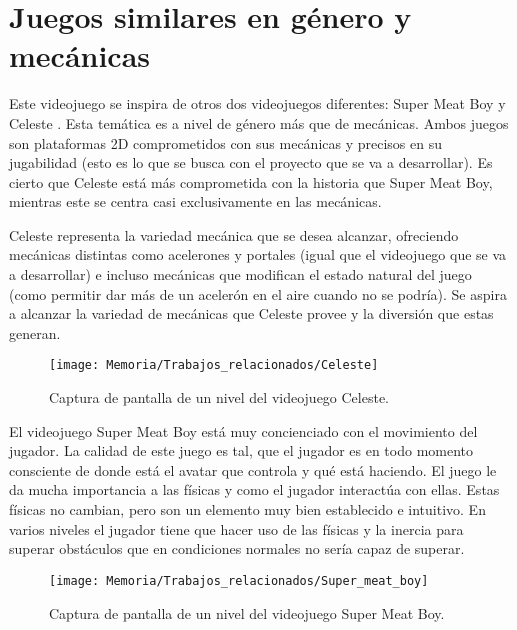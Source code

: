 
\section{Juegos similares en género y mecánicas}
Este videojuego se inspira de otros dos videojuegos diferentes: Super Meat Boy \footnotemark y Celeste \footnotemark . Esta temática es a nivel de género más que de mecánicas. Ambos juegos son plataformas 2D comprometidos con sus mecánicas y precisos en su jugabilidad (esto es lo que se busca con el proyecto que se va a desarrollar). Es cierto que Celeste está más comprometida con la historia que Super Meat Boy, mientras este se centra casi exclusivamente en las mecánicas.

Celeste representa la variedad mecánica que se desea alcanzar, ofreciendo mecánicas distintas como acelerones y portales (igual que el videojuego que se va a desarrollar) e incluso mecánicas que modifican el estado natural del juego (como permitir dar más de un acelerón en el aire cuando no se podría). Se aspira a alcanzar la variedad de mecánicas que Celeste provee y la diversión que estas generan.



\clearpage
\begin{figure}[h]
\centering
\texttt{[image: Memoria/Trabajos\_relacionados/Celeste]}
\caption{Captura de pantalla de un nivel del videojuego Celeste.}
\end{figure}

El videojuego Super Meat Boy está muy concienciado con el movimiento del jugador. La calidad de este juego es tal, que el jugador es en todo momento consciente de donde está el avatar que controla y qué está haciendo. El juego le da mucha importancia a las físicas y como el jugador interactúa con ellas. Estas físicas no cambian, pero son un elemento muy bien establecido e intuitivo. En varios niveles el jugador tiene que hacer uso de las físicas y la inercia para superar obstáculos que en condiciones normales no sería capaz de superar.

\begin{figure}[h]
\centering
\texttt{[image: Memoria/Trabajos\_relacionados/Super\_meat\_boy]}
\caption{Captura de pantalla de un nivel del videojuego Super Meat Boy.}
\end{figure}

